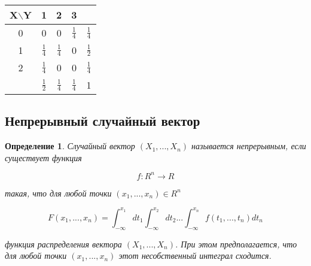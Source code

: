 \documentclass[a4paper, 14pt]{report}
\newtheorem{defenition}{Определение}[section]
\begin{document}
\begin{table}[H]
    \centering
    \begin{tabular}{|c||c|c|c||c|}
        \hline
        X$\backslash$Y & 1 & 2 & 3 & \\
        \hline
        \hline
        0  & 0 & 0 & $\frac{1}{4}$ & $\frac{1}{4}$ \\
        \hline
        1 & $\frac{1}{4}$ & $\frac{1}{4}$ & 0 & $\frac{1}{2}$ \\
        \hline
        2 & $\frac{1}{4}$ & 0 & 0 & $\frac{1}{4}$\\
        \hline
        \hline
          & $\frac{1}{2}$ & $\frac{1}{4}$ & $\frac{1}{4}$ & 1\\
        \hline
    \end{tabular}
\end{table}

\subsection{Непрерывный случайный вектор}

\begin{defenition}
    Случайный вектор $(X_1 , ..., X_n)$ называется непрерывным, если существует функция

    $$
    f : R^n \to R
    $$

    такая, что для любой точки $(x_1, ..., x_n) \in R^n$

    $$
    F(x_1, ..., x_n) = \int_{-\infty}^{x_1} dt_1 \int_{-\infty}^{x_2} dt_2 ... \int_{-\infty}^{x_n} f(t_1, ..., t_n) dt_n
    $$

    функция распределения вектора $(X_1, ..., X_n)$. При этом предполагается, что для любой точки $(x_1,...,x_n)$ этот несобственный интеграл сходится.
\end{defenition}
\end{document}
